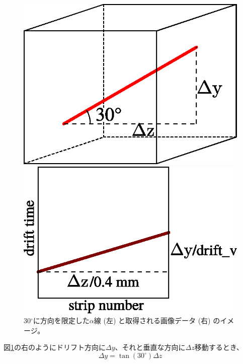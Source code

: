 \documentclass[../master]{subfiles}
\begin{document}
\begin{figure}
  \centering
  \begin{minipage}{0.45\columnwidth}
    \centering
    \includegraphics[clip, width=0.9\columnwidth]{drift_v_source.eps}
  \end{minipage}
  \begin{minipage}{0.45\columnwidth}
    \centering
    \includegraphics[clip, width=0.9\columnwidth]{drift_v_image.eps}
  \end{minipage}
  \caption[30${}^{\circ}$に方向を限定した$\alpha$線と取得される画像データのイメージ。]
          {30${}^{\circ}$に方向を限定した$\alpha$線 (左) と取得される画像データ (右) のイメージ。}
  \label{fig::drift_v_image}
\end{figure}
図\ref{fig::drift_v_image}の右のようにドリフト方向に$\Delta y$、それと垂直な方向に$\Delta z$移動するとき、
\begin{equation}
  \Delta y = \tan(30^{\circ})\Delta z \label{eq::deltay_deltaz}
\end{equation}
\end{document}

